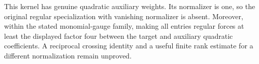 This kernel has genuine quadratic auxiliary weights. Its normalizer is one, so the original regular specialization with vanishing normalizer is absent. Moreover, within the stated monomial-gauge family, making all entries regular forces at least the displayed factor four between the target and auxiliary quadratic coefficients. A reciprocal crossing identity and a useful finite rank estimate for a different normalization remain unproved.
